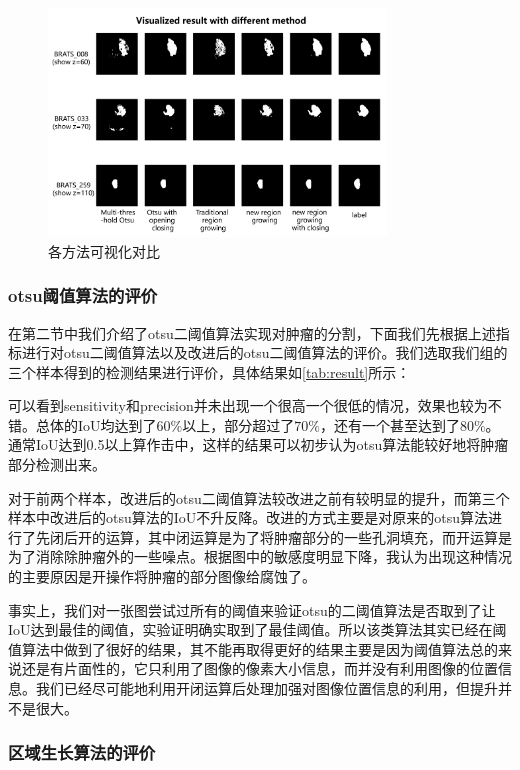 \documentclass[UTF8]{ctexart}
\begin{document}
  \begin{figure}[H]
    \centering  %
    \includegraphics[width=0.8\textwidth]{figure/result.png}
    \caption{各方法可视化对比}
\end{figure}
		
	\subsubsection{otsu阈值算法的评价}
	在第二节中我们介绍了otsu二阈值算法实现对肿瘤的分割，下面我们先根据上述指标进行对otsu二阈值算法以及改进后的otsu二阈值算法的评价。我们选取我们组的三个样本得到的检测结果进行评价，具体结果如\ref{tab:result}所示：
	
	可以看到sensitivity和precision并未出现一个很高一个很低的情况，效果也较为不错。总体的IoU均达到了$60\%$以上，部分超过了$70\%$，还有一个甚至达到了$80\%$。通常IoU达到0.5以上算作击中，这样的结果可以初步认为otsu算法能较好地将肿瘤部分检测出来。
	
	对于前两个样本，改进后的otsu二阈值算法较改进之前有较明显的提升，而第三个样本中改进后的otsu算法的IoU不升反降。改进的方式主要是对原来的otsu算法进行了先闭后开的运算，其中闭运算是为了将肿瘤部分的一些孔洞填充，而开运算是为了消除除肿瘤外的一些噪点。根据图中的敏感度明显下降，我认为出现这种情况的主要原因是开操作将肿瘤的部分图像给腐蚀了。
	
	事实上，我们对一张图尝试过所有的阈值来验证otsu的二阈值算法是否取到了让IoU达到最佳的阈值，实验证明确实取到了最佳阈值。所以该类算法其实已经在阈值算法中做到了很好的结果，其不能再取得更好的结果主要是因为阈值算法总的来说还是有片面性的，它只利用了图像的像素大小信息，而并没有利用图像的位置信息。我们已经尽可能地利用开闭运算后处理加强对图像位置信息的利用，但提升并不是很大。
	
	\subsubsection{区域生长算法的评价}
	
\end{document}
